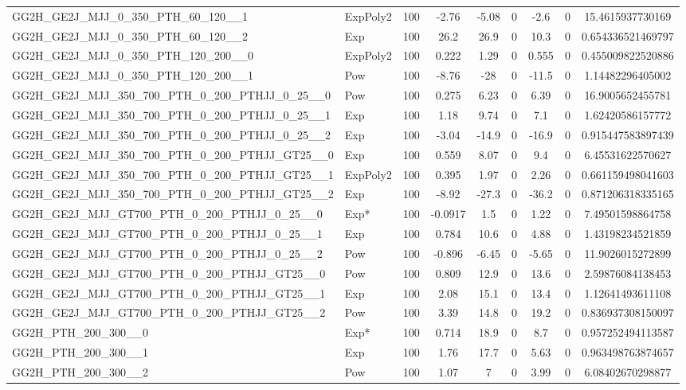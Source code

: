 \begin{table}[!h]
{\begin{tabular}{llccccccS[table-format = 3.2, round-mode = places, round-precision = 2]}
GG2H\_GE2J\_MJJ\_0\_350\_PTH\_60\_120\_\_1 & ExpPoly2 &100&-2.76&-5.08&0&-2.6&0&15.4615937730169\\
  GG2H\_GE2J\_MJJ\_0\_350\_PTH\_60\_120\_\_2 & Exp &100&26.2&26.9&0&10.3&0&0.654336521469797\\
GG2H\_GE2J\_MJJ\_0\_350\_PTH\_120\_200\_\_0 & ExpPoly2 &100&0.222&1.29&0&0.555&0&0.455009822520886\\
  GG2H\_GE2J\_MJJ\_0\_350\_PTH\_120\_200\_\_1 & Pow &100&-8.76&-28&0&-11.5&0&1.14482296405002\\
  GG2H\_GE2J\_MJJ\_350\_700\_PTH\_0\_200\_PTHJJ\_0\_25\_\_0 & Pow &100&0.275&6.23&0&6.39&0&16.9005652455781\\
 GG2H\_GE2J\_MJJ\_350\_700\_PTH\_0\_200\_PTHJJ\_0\_25\_\_1 & Exp &100&1.18&9.74&0&7.1&0&1.62420586157772\\
 GG2H\_GE2J\_MJJ\_350\_700\_PTH\_0\_200\_PTHJJ\_0\_25\_\_2 & Exp &100&-3.04&-14.9&0&-16.9&0&0.915447583897439\\
 GG2H\_GE2J\_MJJ\_350\_700\_PTH\_0\_200\_PTHJJ\_GT25\_\_0 & Exp &100&0.559&8.07&0&9.4&0&6.45531622570627\\
 GG2H\_GE2J\_MJJ\_350\_700\_PTH\_0\_200\_PTHJJ\_GT25\_\_1 & ExpPoly2 &100&0.395&1.97&0&2.26&0&0.661159498041603\\
 GG2H\_GE2J\_MJJ\_350\_700\_PTH\_0\_200\_PTHJJ\_GT25\_\_2 & Exp &100&-8.92&-27.3&0&-36.2&0&0.871206318335165\\
 GG2H\_GE2J\_MJJ\_GT700\_PTH\_0\_200\_PTHJJ\_0\_25\_\_0 & Exp* &100&-0.0917&1.5&0&1.22&0&7.49501598864758\\
 GG2H\_GE2J\_MJJ\_GT700\_PTH\_0\_200\_PTHJJ\_0\_25\_\_1 & Exp &100&0.784&10.6&0&4.88&0&1.43198234521859\\
 GG2H\_GE2J\_MJJ\_GT700\_PTH\_0\_200\_PTHJJ\_0\_25\_\_2 & Pow &100&-0.896&-6.45&0&-5.65&0&11.9026015272899\\
 GG2H\_GE2J\_MJJ\_GT700\_PTH\_0\_200\_PTHJJ\_GT25\_\_0 & Pow &100&0.809&12.9&0&13.6&0&2.59876084138453\\
 GG2H\_GE2J\_MJJ\_GT700\_PTH\_0\_200\_PTHJJ\_GT25\_\_1 & Exp &100&2.08&15.1&0&13.4&0&1.12641493611108\\
 GG2H\_GE2J\_MJJ\_GT700\_PTH\_0\_200\_PTHJJ\_GT25\_\_2 & Pow &100&3.39&14.8&0&19.2&0&0.836937308150097\\
 GG2H\_PTH\_200\_300\_\_0 & Exp* &100&0.714&18.9&0&8.7&0&0.957252494113587\\
 GG2H\_PTH\_200\_300\_\_1 & Exp &100&1.76&17.7&0&5.63&0&0.963498763874657\\
 GG2H\_PTH\_200\_300\_\_2 & Pow &100&1.07&7&0&3.99&0&6.08402670298877\\

\end{tabular}}
\end{table}
